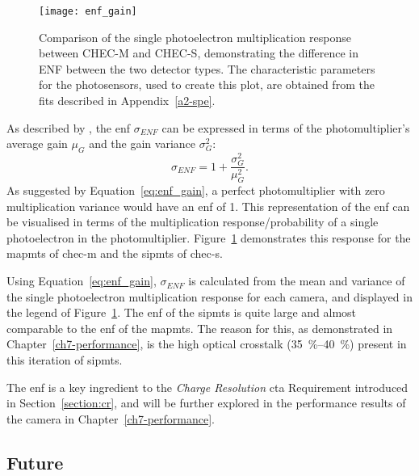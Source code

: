 \begin{figure}
	\centering
    \texttt{[image: enf\_gain]} 
	\caption[Comparison of the single photoelectron multiplication response between CHEC-M and CHEC-S.]{Comparison of the single photoelectron multiplication response between CHEC-M and CHEC-S, demonstrating the difference in ENF between the two detector types. The characteristic parameters for the photosensors, used to create this plot, are obtained from the fits described in Appendix~\ref{a2-spe}.}
	\label{fig:enf_gain}
\end{figure}

As described by \textcite{Teich1986}, the \gls{enf} $\sigma_{ENF}$ can be expressed in terms of the photomultiplier's average gain $\mu_G$ and the gain variance $\sigma_G^2$:
\begin{equation} \label{eq:enf_gain}
\sigma_{ENF} = 1 + \frac{\sigma_G^2}{\mu_G^2}.
\end{equation}
As suggested by Equation~\ref{eq:enf_gain}, a perfect photomultiplier with zero multiplication variance would have an \gls{enf} of 1. This representation of the \gls{enf} can be visualised in terms of the multiplication response/probability of a single photoelectron in the photomultiplier. Figure~\ref{fig:enf_gain} demonstrates this response for the \glspl{mapmt} of \gls{chec-m} and the \glspl{sipmt} of \gls{chec-s}. 

Using Equation~\ref{eq:enf_gain}, $\sigma_{ENF}$ is calculated from the mean and variance of the single photoelectron multiplication response for each camera, and displayed in the legend of Figure~\ref{fig:enf_gain}. The \gls{enf} of the \glspl{sipmt} is quite large and almost comparable to the \gls{enf} of the \glspl{mapmt}. The reason for this, as demonstrated in Chapter~\ref{ch7-performance}, is the high optical crosstalk (\SIrange{35}{40}{\percent}) present in this iteration of \glspl{sipmt}.

The \gls{enf} is a key ingredient to the \textit{Charge Resolution} \gls{cta} Requirement introduced in Section~\ref{section:cr}, and will be further explored in the performance results of the camera in Chapter~\ref{ch7-performance}.

\subsection{Future} \label{section:sipmt_future}


